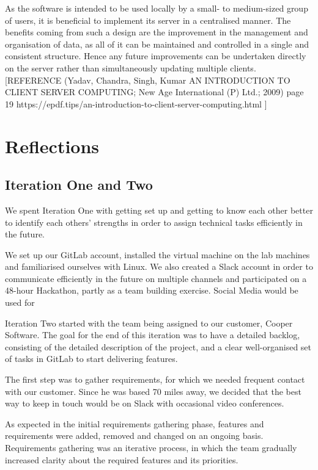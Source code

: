 \documentclass{l3proj}
\begin{document}
As the software is intended to be used locally by a small- to medium-sized group of users, it is beneficial to implement its server in a centralised manner. The benefits coming from such a design are the improvement in the management and organisation of data, as all of it can be maintained and controlled in a single and consistent structure. Hence any future improvements can be undertaken directly on the server rather than simultaneously updating multiple clients. [REFERENCE (Yadav, Chandra, Singh, Kumar AN INTRODUCTION TO CLIENT SERVER COMPUTING; New Age International (P) Ltd.; 2009) page 19 https://epdf.tips/an-introduction-to-client-server-computing.html ]


\section{Reflections}
\subsection{Iteration One and Two}

We spent Iteration One with getting set up and getting to know each other better to identify each others’ strengths  in order to assign technical tasks efficiently in the future.

We set up our GitLab account, installed the virtual machine on the lab machines and familiarised ourselves with Linux.
We also created a Slack account in order to communicate efficiently in the future on multiple channels and participated on a 48-hour Hackathon, partly as a team building exercise. Social Media would be used for  

Iteration Two started with the team being assigned to our customer, Cooper Software. The goal for the end of this iteration was to have a detailed backlog, consisting of the detailed description of the project, and a clear well-organised set of tasks in GitLab to start delivering features.

The first step was to gather requirements, for which we needed frequent contact with our customer. Since he was based 70 miles away, we decided that the best way to keep in touch would be on Slack with occasional video conferences.

As expected in the initial requirements gathering phase, features and requirements were added, removed and changed on an ongoing basis. Requirements gathering was an iterative process, in which the team gradually increased clarity about the required features and its priorities.
\end{document}
